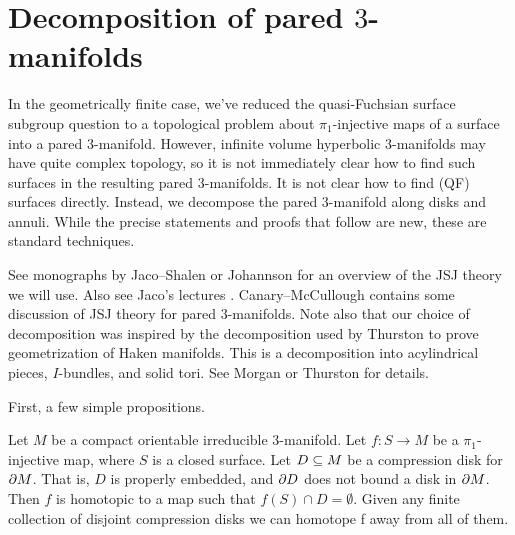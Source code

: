 \section{Decomposition of pared $3$-manifolds}

In the geometrically finite case, we've reduced the quasi-Fuchsian surface
subgroup question to a topological problem about $\pi_1$-injective maps of
a surface into a pared $3$-manifold. However, infinite volume hyperbolic
$3$-manifolds may have quite complex topology, so it is not immediately clear
how to find such surfaces in the resulting pared $3$-manifolds. It is not clear
how to find (QF) surfaces directly. Instead, we decompose the pared
$3$-manifold along disks and annuli. While the precise statements and proofs
that follow are new, these are standard techniques.

See monographs by Jaco--Shalen \cite{JacoShalen} or Johannson \cite{Johannson}
for an overview of the JSJ theory we will use. Also see Jaco's lectures
\cite{Jaco}. Canary--McCullough \cite{CMc} contains some discussion of JSJ
theory for pared $3$-manifolds.  Note also that our choice of decomposition was
inspired by the decomposition used by Thurston to prove geometrization of Haken
manifolds.  This is a decomposition into acylindrical pieces, $I$-bundles, and
solid tori.  See Morgan \cite{Mo} or Thurston \cite{ThurstonIII} for details.

First, a few simple propositions.

\begin{prop}

Let $M$ be a compact orientable irreducible $3$-manifold. Let $f \colon S \to
M$ be a $\pi_1$-injective map, where $S$ is a closed surface.  Let $D \subseteq M$
be a compression disk for $\partial M$. That is, $D$ is properly embedded, and $\partial
D$ does not bound a disk in $\partial M$. Then $f$ is homotopic to a map such that
$f(S) \cap D = \emptyset$. Given any finite collection of disjoint compression
disks we can homotope f away from all of them.

\end{prop}

